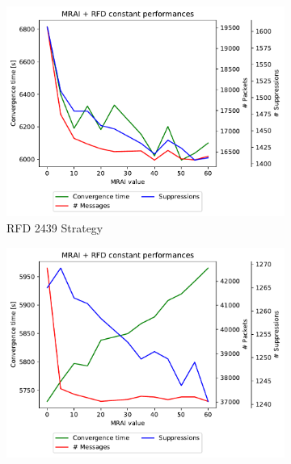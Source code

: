 \begin{figure}[h]
     \centering
     \begin{subfigure}[b]{0.49\textwidth}
         \centering
         \includegraphics[width=\textwidth]{images/RFD/miceVSelephants/MultiMRAI/mice/cisco_1000_RFD_2439-constant_mrai_rfd_evolution.pdf}
         \caption{RFD 2439 Strategy}
         \label{fig:1000_2439RFD_multiMRAI_mice}
     \end{subfigure}
     \hfill
     \begin{subfigure}[b]{0.49\textwidth}
         \centering
         \includegraphics[width=\textwidth]{images/RFD/miceVSelephants/MultiMRAI/mice/cisco_1000_RFD_7196_aggressive-constant_mrai_rfd_evolution.pdf}

\end{subfigure}
\end{figure}
